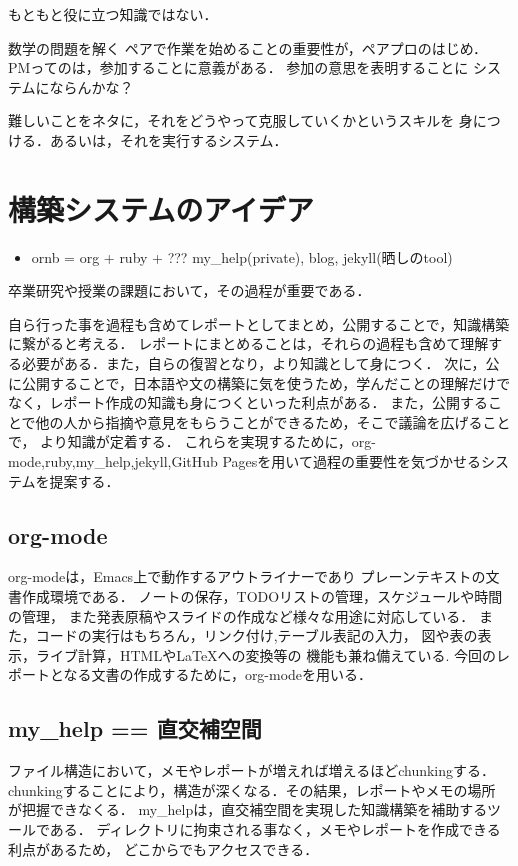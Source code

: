 \documentclass[12pt,a4]{jreport}%
\begin{document}
もともと役に立つ知識ではない．

数学の問題を解く
ペアで作業を始めることの重要性が，ペアプロのはじめ．
PMってのは，参加することに意義がある．
参加の意思を表明することに
システムにならんかな？

難しいことをネタに，それをどうやって克服していくかというスキルを
身につける．あるいは，それを実行するシステム．

\chapter{構築システムのアイデア}
\label{sec:orgf8af29e}
\begin{itemize}
\item ornb = org + ruby + ??? my\_help(private), blog, jekyll(晒しのtool)
\end{itemize}

卒業研究や授業の課題において，その過程が重要である．

自ら行った事を過程も含めてレポートとしてまとめ，公開することで，知識構築に繋がると考える．
レポートにまとめることは，それらの過程も含めて理解する必要がある．また，自らの復習となり，より知識として身につく．
次に，公に公開することで，日本語や文の構築に気を使うため，学んだことの理解だけでなく，レポート作成の知識も身につくといった利点がある．
また，公開することで他の人から指摘や意見をもらうことができるため，そこで議論を広げることで，
より知識が定着する．
これらを実現するために，org-mode,ruby,my\_help,jekyll,GitHub Pagesを用いて過程の重要性を気づかせるシステムを提案する．
\section{org-mode}
\label{sec:orgd6861f9}
org-modeは，Emacs上で動作するアウトライナーであり
プレーンテキストの文書作成環境である．
ノートの保存，TODOリストの管理，スケジュールや時間の管理，
また発表原稿やスライドの作成など様々な用途に対応している．
また，コードの実行はもちろん，リンク付け,テーブル表記の入力，
図や表の表示，ライブ計算，HTMLや\LaTeX{}への変換等の
機能も兼ね備えている.
今回のレポートとなる文書の作成するために，org-modeを用いる．

\section{my\_help == 直交補空間}
\label{sec:org77a579f}
ファイル構造において，メモやレポートが増えれば増えるほどchunkingする．
chunkingすることにより，構造が深くなる．その結果，レポートやメモの場所
が把握できなくる．
my\_helpは，直交補空間を実現した知識構築を補助するツールである．
ディレクトリに拘束される事なく，メモやレポートを作成できる利点があるため，
どこからでもアクセスできる．
\end{document}
